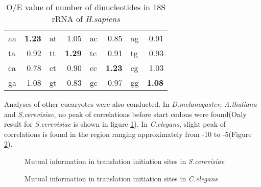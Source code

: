 \begin{table}
\noindent
\begin{center}
\begin{tabular}{lr|lr|lr|lr}
aa & {\bf 1.23} &  at & 1.05 & ac & 0.85 & ag & 0.91 \\
ta & 0.92 &  tt & {\bf 1.29} & tc & 0.91 & tg & 0.93 \\
ca & 0.78 &  ct & 0.90 & cc & {\bf 1.23} & cg & 1.03 \\
ga & 1.08 &  gt & 0.83 & gc & 0.97 & gg & {\bf 1.08} \\
\end{tabular}
\end{center}
\caption{O/E value of number of dinucleotides in 18S rRNA of {\it H.sapiens}}
\label{hsap_18S_oe}
\end{table}

Analyses of other eucaryotes were also conducted. In {\it
D.melanogaster}, {\it A.thaliana} and {\it S.cerevisiae}, no peak of
correlations before start codons were found(Only result for {\it
S.cerevisiae} is shown in figure \ref{Scer_minf1}). In {\it C.elegans},
slight peak of correlations is found in the region ranging approximately
from -10 to -5(Figure \ref{Cele_minf1}).

\begin{figure}
\begin{center}
\end{center}
\caption{Mutual information in translation initiation sites in {\it S.cerevisiae}}
\label{Scer_minf1}
\end{figure}

\begin{figure}
\begin{center}
\end{center}
\caption{Mutual information in translation initiation sites in {\it C.elegans}}
\label{Cele_minf1}
\end{figure}

